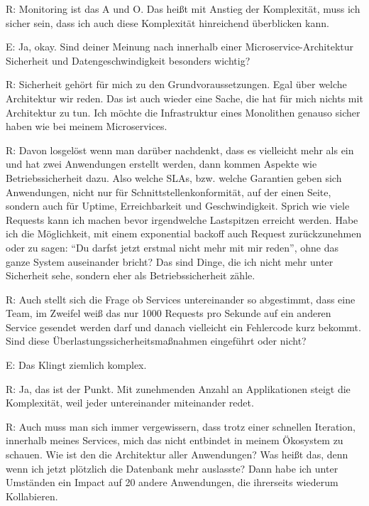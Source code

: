 \label{appendix:r-31}
R: Monitoring ist das A und O. Das heißt mit Anstieg der Komplexität, muss ich sicher sein, dass ich auch diese Komplexität hinreichend überblicken kann.

E: Ja, okay. Sind deiner Meinung nach innerhalb einer Microservice-Architektur Sicherheit und Datengeschwindigkeit besonders wichtig?

\label{appendix:r-32}
R: Sicherheit gehört für mich zu den Grundvoraussetzungen. Egal über welche Architektur wir reden. Das ist auch wieder eine Sache, die hat für mich nichts mit Architektur zu tun. Ich möchte  die Infrastruktur eines Monolithen genauso sicher haben wie bei meinem Microservices. 

\label{appendix:r-33}
R: Davon losgelöst wenn man darüber nachdenkt, dass es vielleicht mehr als ein und hat zwei Anwendungen erstellt werden, dann kommen Aspekte wie Betriebssicherheit dazu. Also welche SLAs, bzw. welche Garantien geben sich Anwendungen, nicht nur für Schnittstellenkonformität, auf der einen Seite, sondern auch für Uptime, Erreichbarkeit und Geschwindigkeit. Sprich wie viele Requests kann ich machen bevor irgendwelche Lastspitzen erreicht werden. Habe ich die Möglichkeit, mit einem exponential backoff auch Request zurückzunehmen oder zu sagen: “Du darfst jetzt erstmal nicht mehr mit mir reden”, ohne das ganze System auseinander bricht? Das sind Dinge, die ich nicht mehr unter Sicherheit sehe, sondern eher als Betriebssicherheit zähle.

\label{appendix:r-34}
R: Auch stellt sich die Frage ob Services untereinander so abgestimmt, dass eine Team, im Zweifel weiß das nur 1000 Requests pro Sekunde auf ein anderen Service gesendet werden darf und danach vielleicht ein Fehlercode kurz bekommt. Sind diese Überlastungssicherheitsmaßnahmen eingeführt oder nicht?

E: Das Klingt ziemlich komplex.

\label{appendix:r-35}
R: Ja, das ist der Punkt. Mit zunehmenden Anzahl an Applikationen steigt die Komplexität, weil jeder untereinander miteinander redet.

\label{appendix:r-36}
R: Auch muss man sich immer vergewissern, dass trotz einer schnellen Iteration, innerhalb meines Services, mich das nicht entbindet in meinem Ökosystem zu schauen. Wie ist den die Architektur aller Anwendungen? Was heißt das, denn wenn ich jetzt plötzlich die Datenbank  mehr auslasste? Dann habe ich unter Umständen ein Impact auf 20 andere Anwendungen, die ihrerseits wiederum Kollabieren.

